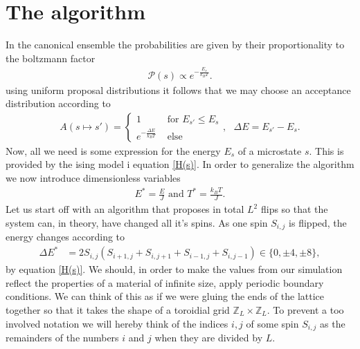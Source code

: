 \documentclass[twoside,utf8]{article}
\newcommand{\EQU}[1] { \begin{equation*} \begin{split} #1 \end{split} \end{equation*} }
\begin{document}
\section{The algorithm} 
In the canonical ensemble the probabilities are given by their proportionality to the boltzmann factor
\EQU{
\mathcal{P}(s) \propto e^{- \frac{E_s}{k_B T} }.
}
using uniform proposal distributions it follows that we may choose an acceptance distribution according to
\EQU{
A(s\mapsto s') = \begin{cases}
1 & \mbox{ for } E_{s'} \leq E_s  \\
e^{-\frac{\Delta E}{k_B T} } & \mbox{ else } 
\end{cases} , \ \ \  \Delta E = E_{s'}-E_s.
}
Now, all we need is some expression for the energy $E_s$ of a microstate $s$. This is provided by the ising model i equation \ref*{H(s)}.
In order to generalize the algorithm we now introduce dimensionless variables
\EQU{
E^* = \frac{E}{J} \mbox{ and } T^* = \frac{k_B T}{J}.
}
Let us start off with an algorithm that proposes in total $L^2$ flips so that the system can, in theory, have changed all it's spins.
As one spin $S_{i,j}$ is flipped, the energy changes according to
\EQU{
\Delta E^* &= 2S_{i,j}\left(S_{i+1,j}+S_{i,j+1}+S_{i-1,j}+S_{i,j-1}\right)\in \{ 0, \pm 4, \pm 8 \},
}
by equation \ref*{H(s)}. We should, in order to make the values from our simulation reflect the properties of a material of infinite size, apply periodic boundary conditions. We can think of this as if we were gluing the ends of the lattice together so that it takes the shape of a toroidial grid $\mathbb{Z}_L \times \mathbb{Z}_L$. To prevent a too involved notation we will hereby think of the indices $i,j$ of some spin $S_{i,j}$ as the remainders of the numbers $i$ and $j$ when they are divided by $L$.
\end{document}
